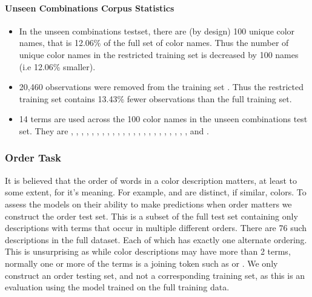 \paragraph{Unseen Combinations Corpus Statistics}
\begin{itemize}
	\item In the unseen combinations testset, there are (by design) 100 unique color names, that is 12.06\% of the full set of color names. Thus the number of unique color names in the restricted training set is decreased by 100 names (i.e 12.06\% smaller).
	\item 20,460 observations were removed from the training set . Thus the restricted training set contains 13.43\% fewer observations than the full training set.
	\item 14 terms are used across the 100 color names in the unseen combinations test set.
	They are , , , , , , , , , , , , , , , , , , , , , , , and \natlang{-}.
\end{itemize}


\subsubsection{Order Task}\label{sec:orderdata}
It is believed that the order of words in a color description matters, at least to some extent, for it's meaning.
For example,  and  are distinct, if similar, colors.
To assess the models on their ability to make predictions when order matters we construct the order test set.
This is a subset of the full test set containing only descriptions with terms that occur in multiple different orders.
There are 76 such descriptions in the full dataset.
Each of which has exactly one alternate ordering.
This is unsurprising as while color descriptions may have more than 2 terms, normally one or more of the terms is a joining token such as  or \natlang{-}.
We only construct an order testing set, and not a corresponding training set, as this is an evaluation using the model trained on the full training data.


